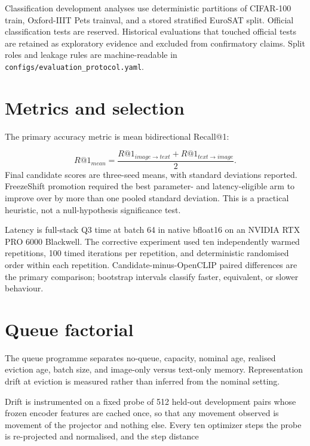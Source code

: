 Classification development analyses use deterministic partitions of CIFAR-100 train, Oxford-IIIT Pets trainval, and a stored stratified EuroSAT split. Official classification tests are reserved. Historical evaluations that touched official tests are retained as exploratory evidence and excluded from confirmatory claims. Split roles and leakage rules are machine-readable in \texttt{configs/\linebreak[1]evaluation\_\linebreak[1]protocol.\linebreak[1]yaml}.

\section{Metrics and selection}
The primary accuracy metric is mean bidirectional Recall@1:

\begin{equation*}
R@1_{mean}=\frac{R@1_{image\rightarrow text}+R@1_{text\rightarrow image}}{2}.
\end{equation*}
Final candidate scores are three-seed means, with standard deviations reported. FreezeShift promotion required the best parameter- and latency-eligible arm to improve over \MTone{} by more than one pooled standard deviation. This is a practical heuristic, not a null-hypothesis significance test.

Latency is full-stack Q3 time at batch 64 in native bfloat16 on an NVIDIA RTX PRO 6000 Blackwell. The corrective experiment used ten independently warmed repetitions, 100 timed iterations per repetition, and deterministic randomised order within each repetition. Candidate-minus-OpenCLIP paired differences are the primary comparison; bootstrap intervals classify faster, equivalent, or slower behaviour.

\section{Queue factorial}
The queue programme separates no-queue, capacity, nominal age, realised eviction age, batch size, and image-only versus text-only memory. Representation drift at eviction is measured rather than inferred from the nominal setting.

Drift is instrumented on a fixed probe of 512 held-out development pairs whose frozen encoder features are cached once, so that any movement observed is movement of the projector and nothing else. Every ten optimizer steps the probe is re-projected and normalised, and the step distance

